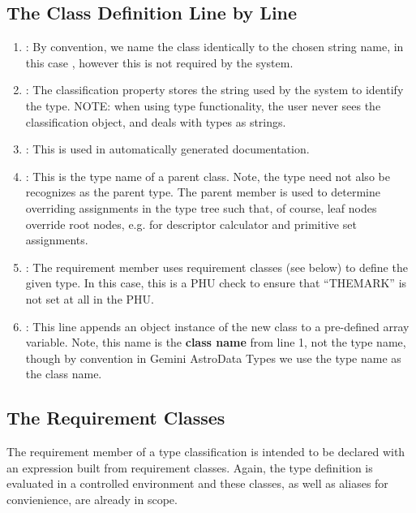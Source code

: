 \documentclass[letterpaper,10pt,english]{sphinxmanual}
\begin{document}
\subsection{The Class Definition Line by Line}
\label{creatingAnAstroDataType:the-class-definition-line-by-line}\begin{enumerate}
\item {} 
:
By convention, we name the class identically to the chosen string name, in
this case , however this is not required by the system.

\item {} 
:
The classification  property stores the string used by the system
to identify the type. NOTE: when using type functionality, the user never
sees the classification object, and deals with types as strings.

\item {} 
:
This is used in automatically generated documentation.

\item {} 
:
This is the type name of a parent class.  Note, the type need not also be
recognizes as the parent type.  The parent member is used to determine
overriding assignments in the type tree such that, of course, leaf nodes
override root nodes, e.g. for descriptor calculator and primitive set
assignments.

\item {} 
:
The requirement member uses requirement classes (see below) to define the given type.
In this case, this is a PHU check to ensure that ``THEMARK'' is not set at all
in the PHU.

\item {} 
:
This line appends an object instance of the new class to a pre-defined
 array variable. Note, this name is the \textbf{class name} from line
1, not the type name, though by convention in Gemini AstroData Types we use
the type name as the class name.

\end{enumerate}


\subsection{The Requirement Classes}
\label{creatingAnAstroDataType:the-requirement-classes}
The requirement member of a type classification is intended to be declared
with an expression built from requirement classes.  Again, the type definition
is evaluated in a controlled environment and these classes, as well as aliases
for convienience, are already in scope.
\end{document}
